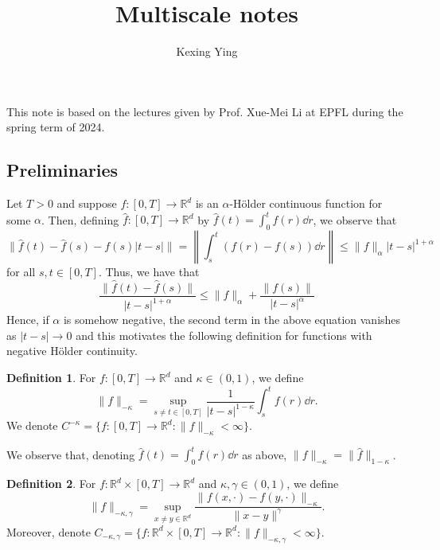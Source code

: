 \documentclass[]{article}
\theoremstyle{definition}
\theoremstyle{definition}
\newtheorem{definition}{Definition}
\begin{document}
\title{Multiscale notes}
\author{Kexing Ying}
\maketitle

This note is based on the lectures given by Prof. Xue-Mei Li at EPFL during the spring term of 2024. 

\subsection*{Preliminaries}

Let \(T > 0\) and suppose \(f : [0, T] \to \mathbb{R}^d\) is an \(\alpha\)-H\"older 
continuous function for some \(\alpha\). Then, defining \(\hat f : [0, T] \to \mathbb{R}^d\) by 
\(\hat f(t) = \int_0^t f(r) \dd r\), we observe that
\[\|\hat f(t) - \hat f(s) - f(s)|t - s|\| = \left\|\int_s^t (f(r) - f(s)) \dd r\right\| \le \|f\|_{\alpha}|t - s|^{1 + \alpha}\]
for all \(s, t \in [0, T]\). Thus, we have that 
\begin{equation}\label{eq:hatfholder}
  \frac{\|\hat f(t) - \hat f(s)\|}{|t - s|^{1 + \alpha}} \le \|f\|_{\alpha} + \frac{\|f(s)\|}{|t - s|^{\alpha}}
\end{equation}
Hence, if \(\alpha\) is somehow negative, the second term in the above equation vanishes as \(|t - s| \to 0\) 
and this motivates the following definition for functions with negative H\"older continuity.

\begin{definition}
  For \(f : [0, T] \to \mathbb{R}^d\) and \(\kappa \in (0, 1)\), we define 
  \[\|f\|_{-\kappa} = \sup_{s \neq t \in [0, T]} \frac{1}{|t - s|^{1 - \kappa}} \int_s^t f(r) \dd r.\]
  We denote \(C^{-\kappa} = \{f : [0, T] \to \mathbb{R}^d : \|f\|_{-\kappa} < \infty\}.\)
\end{definition}

We observe that, denoting \(\hat f(t) = \int_0^t f(r) \dd r\) as above, 
\(\|f\|_{- \kappa} = \|\hat f\|_{1 - \kappa}\).

\begin{definition}
  For \(f : \mathbb{R}^d \times [0, T] \to \mathbb{R}^d\) and \(\kappa, \gamma \in (0, 1)\), we define 
  \[\|f\|_{-\kappa, \gamma} = \sup_{x \neq y \in \mathbb{R}^d} \frac{\|f(x, \cdot) - f(y, \cdot)\|_{-\kappa}}{\|x - y\|^\gamma}.\]
  Moreover, denote \(C_{- \kappa, \gamma} = \{f : \mathbb{R}^d \times [0, T] \to \mathbb{R}^d : \|f\|_{-\kappa, \gamma} < \infty\}\).
\end{definition}
\end{document}
